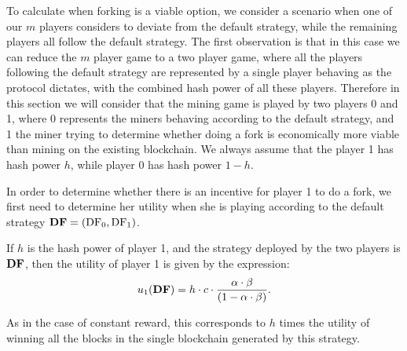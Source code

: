 To calculate when forking is a viable option, we consider a scenario when one of our $m$ players considers to deviate from the default strategy, while the remaining players all follow the default strategy. 
The first observation is that in this case we can reduce the $m$ player game to a two player game, where all the players following the default strategy are represented by a single player behaving as the protocol dictates, with the combined hash power of all these players. Therefore  in this section we will consider that the mining game is played by two players 0 and 1, where 0 represents the miners behaving according to the default strategy, and 1 the miner trying to determine whether doing a fork is economically more viable than mining on the existing blockchain. We always assume that the player 1 has hash power $h$, while player 0 has hash power $1-h$.

In order to determine whether there is an incentive for player 1 to do a fork, we first need to determine her utility when she is playing according to the default strategy $\text{\rm {\bf DF}} = (\text{\rm DF}_0,\text{\rm DF}_1)$. 

\begin{lemma}\label{lem:default_utility}
If $h$ is the hash power of player 1, and the strategy deployed by the two players is $\text{\rm {\bf DF}}$, then the utility of player 1 is given by the expression:
$$u_1(\text{\rm {\bf DF}}) = h\cdot c\cdot\frac{\alpha\cdot\beta}{(1-\alpha\cdot\beta)}.$$
\end{lemma}
As in the case of constant reward, this corresponds to $h$ times the utility of winning all the blocks in the single blockchain generated by this strategy.


